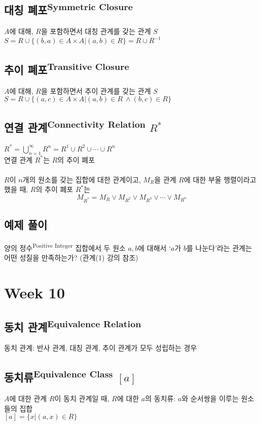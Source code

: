 \subsection{대칭 폐포\textsuperscript{Symmetric Closure}}
$A$에 대해, $R$을 포함하면서 대칭 관계를 갖는 관계 $S$\\
$S = R \cup \{(b, a) \in A \times A|(a, b) \in R\} = R \cup R^{-1}$

\subsection{추이 폐포\textsuperscript{Transitive Closure}}
$A$에 대해, $R$을 포함하면서 추이 관계를 갖는 관계 $S$\\
$S = R \cup \{(a, c) \in A \times A|(a, b) \in R\ \land (b, c) \in R\}$

\subsection{연결 관계\textsuperscript{Connectivity Relation} $R^*$}
$R^* = \bigcup^\infty_{n = 1} R^n = R^1 \cup R^2 \cup \cdots \cup R^n$\\
연결 관계 $R^*$는 $R$의 추이 폐포\\\\
\text{[정리]} $R$이 $n$개의 원소를 갖는 집합에 대한 관계이고, $M_R$을 관계 $R$에 대한 부울 행렬이라고 했을 때, $R$의 추이 폐포 $R^*$는
$$M_{R^*}=M_R\lor M_{R^2}\lor M_{R^3}\lor \cdots \lor M_{R^n}$$

\subsection{예제 풀이}
양의 정수\textsuperscript{Positive Integer} 집합에서 두 원소 $a, b$에 대해서 `$a$가 $b$를 나눈다'라는 관계는 어떤 성질을 만족하는가? (관계(1) 강의 참조)

\newpage
\section{Week 10}
\subsection{동치 관계\textsuperscript{Equivalence Relation}}
동치 관계: 반사 관계, 대칭 관계, 추이 관계가 모두 성립하는 경우

\subsection{동치류\textsuperscript{Equivalence Class} $[a]$}
$A$에 대한 관계 $R$이 동치 관계일 때, $R$에 대한 $a$의 동치류: $a$와 순서쌍을 이루는 원소들의 집합\\
$[a] = \{x|(a, x) \in R\}$

